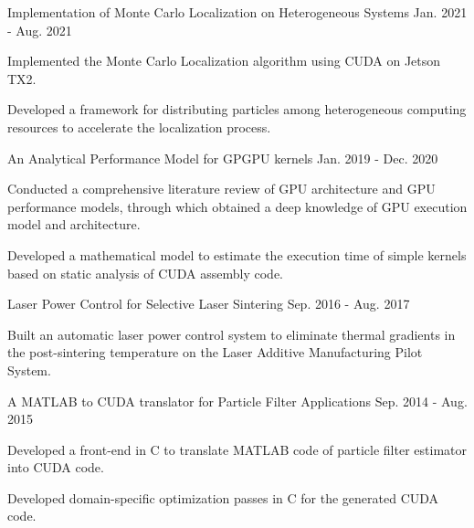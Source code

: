
\begin{cventries}

  \cvresearchentry
  {Implementation of Monte Carlo Localization on Heterogeneous Systems} %
  {Jan. 2021 - Aug. 2021} %
  {%
    \begin{cvitems}
    \item Implemented the Monte Carlo Localization algorithm using CUDA on Jetson TX2.
    \item Developed a framework for distributing particles among heterogeneous
      computing resources to accelerate the localization process.
    \end{cvitems}
  }

  \cvresearchentry
  {An Analytical Performance Model for GPGPU kernels} %
  {Jan. 2019 - Dec. 2020} %
  {%
    \begin{cvitems}
    \item Conducted a comprehensive literature review of GPU architecture and
      GPU performance models, through which obtained a deep knowledge of GPU
      execution model and architecture.
    \item Developed a mathematical model to estimate the execution time of simple
      kernels based on static analysis of CUDA assembly code.
    \end{cvitems}
  }

  \cvresearchentry
  {Laser Power Control for Selective Laser Sintering} %
  {Sep. 2016 - Aug. 2017} %
  {%
    \begin{cvitems}
    \item Built an automatic laser power control system to eliminate thermal
      gradients in the post-sintering temperature on the Laser Additive
      Manufacturing Pilot System.
    \end{cvitems}
  }

  \cvresearchentry
  {A MATLAB to CUDA translator for Particle Filter Applications} %
  {Sep. 2014 - Aug. 2015} %
  {%
    \begin{cvitems}
    \item Developed a front-end in C to translate MATLAB code of particle filter
      estimator into CUDA code.
    \item Developed domain-specific optimization passes in C for the generated
      CUDA code.
    \end{cvitems}
  }


\end{cventries}
